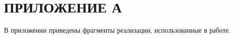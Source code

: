 \section*{ПРИЛОЖЕНИЕ А}

В приложении приведены фрагменты реализации, использованные в работе.


\newpage


\newpage


